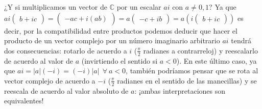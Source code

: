 \documentclass[apuntes]{subfiles}
\begin{document}
   ¿Y si multiplicamos un vector de $\mathbb{C}$ por un escalar $ai$ con $a\neq 0,1$? Ya que $ai\begin{pmatrix}b + ic\end{pmatrix}=\begin{pmatrix}-ac+i(ab)\end{pmatrix}=a\begin{pmatrix}-c+ib\end{pmatrix}=a(i\begin{pmatrix}b+ic\end{pmatrix})$ \textemdash es decir, por la compatibilidad entre productos\textemdash\hspace{0.5mm} podemos deducir que hacer el producto de un vector complejo por un número imaginario arbitrario $ai$ tendrá dos consecuencias: rotarlo de acuerdo a $i$ ($\frac{\pi}{2}$ radianes a contrarreloj) y reescalarlo de acuerdo al valor de $a$ (invirtiendo el sentido si $a<0$). En este último caso, ya que $ai=|a|(-i)=(-i)|a| \ \ \forall \ a<0$, también podríamos pensar que se rota al vector complejo de acuerdo a $-i$ ($\frac{\pi}{2}$ radianes en el sentido de las manecillas) y se reescala de acuerdo al valor absoluto de $a$: ¡ambas interpretaciones son equivalentes! \\
\end{document}

